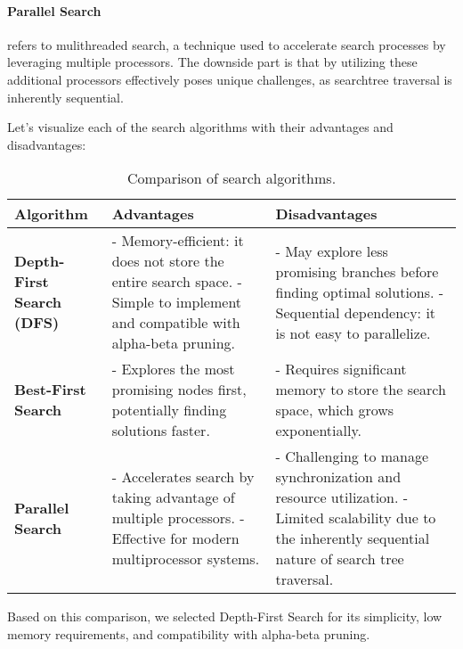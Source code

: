 \paragraph{Parallel Search} refers to mulithreaded search, a technique used to accelerate search processes by leveraging multiple processors. The downside part is that by utilizing these additional processors effectively poses unique challenges, as searchtree traversal is inherently sequential.

\vspace{1em}

Let's visualize each of the search algorithms with their advantages and disadvantages:

\begin{table}[H]
\centering
\begin{tabular}{|p{3.5cm}|p{4.5cm}|p{4.5cm}|}
\hline
\textbf{Algorithm} & \textbf{Advantages} & \textbf{Disadvantages} \\ \hline
\textbf{Depth-First Search (DFS)} 
& 
- Memory-efficient: it does not store the entire search space. \newline 
- Simple to implement and compatible with alpha-beta pruning. 
& 
- May explore less promising branches before finding optimal solutions.
\newline
- Sequential dependency: it is not easy to parallelize. \\ \hline

\textbf{Best-First Search} 
& 
- Explores the most promising nodes first, potentially finding solutions faster. 
& 
- Requires significant memory to store the search space, which grows exponentially. \newline \\ \hline

\textbf{Parallel Search} 
& 
- Accelerates search by taking advantage of multiple processors. \newline 
- Effective for modern multiprocessor systems. 
& 
- Challenging to manage synchronization and resource utilization. \newline 
- Limited scalability due to the inherently sequential nature of search tree traversal. \\ \hline
\end{tabular}
\caption{Comparison of search algorithms.}
\label{tab:search-algorithms}
\end{table}

Based on this comparison, we selected Depth-First Search for its simplicity, low memory requirements, and compatibility with alpha-beta pruning.

